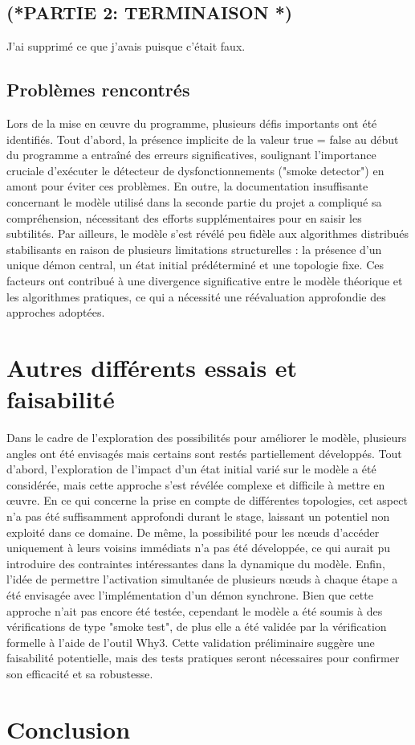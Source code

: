 \documentclass[11pt]{article}
\begin{document}
\subsection{(*PARTIE 2: TERMINAISON *)}
\label{sec:orgc45c09f}

J'ai supprimé ce que j'avais puisque c'était faux.

\subsection{Problèmes rencontrés}
\label{sec:orgb00a655}

Lors de la mise en œuvre du programme, plusieurs défis importants ont été identifiés. 
Tout d'abord, la présence implicite de la valeur true = false au début du programme a entraîné des erreurs significatives, 
soulignant l'importance cruciale d'exécuter le détecteur de dysfonctionnements ("smoke detector") en amont pour éviter ces problèmes. 
En outre, la documentation insuffisante concernant le modèle utilisé dans la seconde partie du projet a compliqué sa compréhension, 
nécessitant des efforts supplémentaires pour en saisir les subtilités. 
Par ailleurs, le modèle s'est révélé peu fidèle aux algorithmes distribués stabilisants en raison de plusieurs limitations structurelles : 
la présence d'un unique démon central, un état initial prédéterminé et une topologie fixe. 
Ces facteurs ont contribué à une divergence significative entre le modèle théorique et les algorithmes pratiques, 
ce qui a nécessité une réévaluation approfondie des approches adoptées.


\section{Autres différents essais et faisabilité}
\label{sec:org58ff5ff}
Dans le cadre de l'exploration des possibilités pour améliorer le modèle, 
plusieurs angles ont été envisagés mais certains sont restés partiellement développés. 
Tout d'abord, l'exploration de l'impact d'un état initial varié sur le modèle a été considérée, 
mais cette approche s'est révélée complexe et difficile à mettre en œuvre. 
En ce qui concerne la prise en compte de différentes topologies, 
cet aspect n'a pas été suffisamment approfondi durant le stage, laissant un potentiel non exploité dans ce domaine. 
De même, la possibilité pour les nœuds d'accéder uniquement à leurs voisins immédiats n'a pas été développée, 
ce qui aurait pu introduire des contraintes intéressantes dans la dynamique du modèle. 
Enfin, l'idée de permettre l'activation simultanée de plusieurs nœuds à chaque étape a été envisagée avec l'implémentation d'un démon synchrone. 
Bien que cette approche n'ait pas encore été testée, cependant le modèle a été soumis à des vérifications de type "smoke test", 
de plus elle a été validée par la vérification formelle à l'aide de l'outil Why3. 
Cette validation préliminaire suggère une faisabilité potentielle, mais des tests pratiques seront nécessaires pour confirmer son efficacité et sa robustesse.


\section{Conclusion}
\label{sec:org58796e7}
\end{document}
